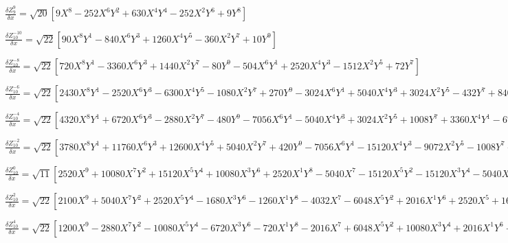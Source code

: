 \documentclass[10pt,landscape]{article}
\begin{document}
\vspace{1.2 mm}
\noindent $ \frac{\delta Z^{9}_{9}}{\delta x} = \sqrt{20} [9X^{8} -252X^{6}Y^{2} +630X^{4}Y^{4} -252X^{2}Y^{6} +9Y^{8}] $

\vspace{1.2 mm}
\noindent $ \frac{\delta Z^{-10}_{10}}{\delta x} = \sqrt{22} [90X^{8}Y^{1} -840X^{6}Y^{3} +1260X^{4}Y^{5} -360X^{2}Y^{7} +10Y^{9}] $

\vspace{1.2 mm}
\noindent $ \frac{\delta Z^{-8}_{10}}{\delta x} = \sqrt{22} [720X^{8}Y^{1} -3360X^{6}Y^{3} +1440X^{2}Y^{7} -80Y^{9} -504X^{6}Y^{1} +2520X^{4}Y^{3} -1512X^{2}Y^{5} +72Y^{7}] $

\vspace{1.2 mm}
\noindent $ \frac{\delta Z^{-6}_{10}}{\delta x} = \sqrt{22} [2430X^{8}Y^{1} -2520X^{6}Y^{3} -6300X^{4}Y^{5} -1080X^{2}Y^{7} +270Y^{9} -3024X^{6}Y^{1} +5040X^{4}Y^{3} +3024X^{2}Y^{5} -432Y^{7} +840X^{4}Y^{1} -1680X^{2}Y^{3} +168Y^{5}] $

\vspace{1.2 mm}
\noindent $ \frac{\delta Z^{-4}_{10}}{\delta x} = \sqrt{22} [4320X^{8}Y^{1} +6720X^{6}Y^{3} -2880X^{2}Y^{7} -480Y^{9} -7056X^{6}Y^{1} -5040X^{4}Y^{3} +3024X^{2}Y^{5} +1008Y^{7} +3360X^{4}Y^{1} -672Y^{5} -420X^{2}Y^{1} +140Y^{3}] $

\vspace{1.2 mm}
\noindent $ \frac{\delta Z^{-2}_{10}}{\delta x} = \sqrt{22} [3780X^{8}Y^{1} +11760X^{6}Y^{3} +12600X^{4}Y^{5} +5040X^{2}Y^{7} +420Y^{9} -7056X^{6}Y^{1} -15120X^{4}Y^{3} -9072X^{2}Y^{5} -1008Y^{7} +4200X^{4}Y^{1} +5040X^{2}Y^{3} +840Y^{5} -840X^{2}Y^{1} -280Y^{3} +30Y^{1}] $

\vspace{1.2 mm}
\noindent $ \frac{\delta Z^{0}_{10}}{\delta x} = \sqrt{11} [2520X^{9} +10080X^{7}Y^{2} +15120X^{5}Y^{4} +10080X^{3}Y^{6} +2520X^{1}Y^{8} -5040X^{7} -15120X^{5}Y^{2} -15120X^{3}Y^{4} -5040X^{1}Y^{6} +3360X^{5} +6720X^{3}Y^{2} +3360X^{1}Y^{4} -840X^{3} -840X^{1}Y^{2} +60X^{1}] $

\vspace{1.2 mm}
\noindent $ \frac{\delta Z^{2}_{10}}{\delta x} = \sqrt{22} [2100X^{9} +5040X^{7}Y^{2} +2520X^{5}Y^{4} -1680X^{3}Y^{6} -1260X^{1}Y^{8} -4032X^{7} -6048X^{5}Y^{2} +2016X^{1}Y^{6} +2520X^{5} +1680X^{3}Y^{2} -840X^{1}Y^{4} -560X^{3} +30X^{1}] $

\vspace{1.2 mm}
\noindent $ \frac{\delta Z^{4}_{10}}{\delta x} = \sqrt{22} [1200X^{9} -2880X^{7}Y^{2} -10080X^{5}Y^{4} -6720X^{3}Y^{6} -720X^{1}Y^{8} -2016X^{7} +6048X^{5}Y^{2} +10080X^{3}Y^{4} +2016X^{1}Y^{6} +1008X^{5} -3360X^{3}Y^{2} -1680X^{1}Y^{4} -140X^{3} +420X^{1}Y^{2}] $
\end{document}
